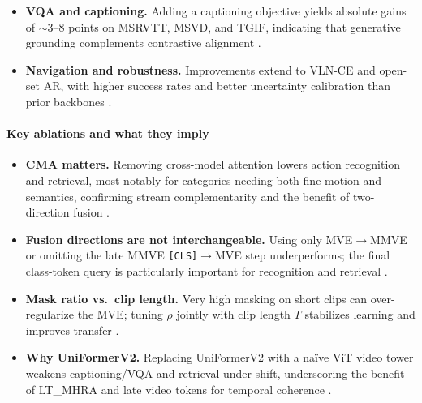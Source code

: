 \begin{enrichment}
\begin{enrichment}
\begin{itemize}
            \item \textbf{VQA and captioning.} Adding a captioning objective yields absolute gains of \(\sim\)3–8 points on MSRVTT, MSVD, and TGIF, indicating that generative grounding complements contrastive alignment \cite{wang2022_internvideo,lei2021_clipbert,fu2021_violet,zellers2021_merlot,wang2022_allinone}. 
            \item \textbf{Navigation and robustness.} Improvements extend to VLN-CE and open-set AR, with higher success rates and better uncertainty calibration than prior backbones \cite{wang2022_internvideo}. 
        \end{itemize}
        
        \paragraph{Key ablations and what they imply}
        \begin{itemize}
            \item \textbf{CMA matters.} Removing cross-model attention lowers action recognition and retrieval, most notably for categories needing both fine motion and semantics, confirming stream complementarity and the benefit of two-direction fusion \cite{wang2022_internvideo}. 
            \item \textbf{Fusion directions are not interchangeable.} Using only MVE\(\rightarrow\)MMVE or omitting the late MMVE \texttt{[CLS]}\(\rightarrow\)MVE step underperforms; the final class-token query is particularly important for recognition and retrieval \cite{wang2022_internvideo}. 
            \item \textbf{Mask ratio vs.\ clip length.} Very high masking on short clips can over-regularize the MVE; tuning \(\rho\) jointly with clip length \(T\) stabilizes learning and improves transfer \cite{wang2022_internvideo}. 
            \item \textbf{Why UniFormerV2.} Replacing UniFormerV2 with a naïve ViT video tower weakens captioning/VQA and retrieval under shift, underscoring the benefit of LT\_MHRA and late video tokens for temporal coherence \cite{li2022_uniformerv2,wang2022_internvideo}. 
        \end{itemize}
        

\end{enrichment}
\end{enrichment}
